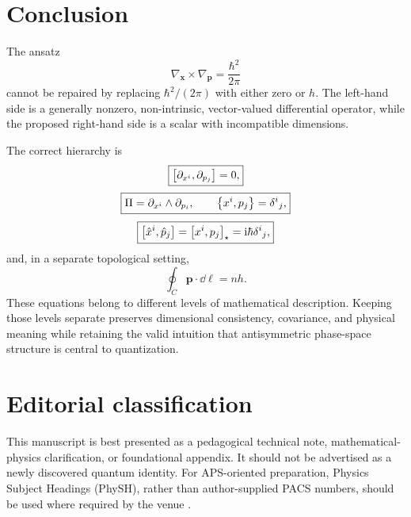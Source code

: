 \section{Conclusion}

The ansatz
\[
\nabla_{\bm{x}}\times\nabla_{\bm{p}}
=
\frac{\hbar^2}{2\pi}
\]
cannot be repaired by replacing \(\hbar^2/(2\pi)\) with either zero or \(h\). The left-hand side is a generally nonzero, non-intrinsic, vector-valued differential operator, while the proposed right-hand side is a scalar with incompatible dimensions.

The correct hierarchy is
\begin{equation}
\boxed{
\left[\partial_{x^i},\partial_{p_j}\right]=0,
}
\end{equation}
\begin{equation}
\boxed{
\Pi=\partial_{x^i}\wedge\partial_{p_i},
\qquad
\left\{x^i,p_j\right\}=\delta^i{}_j,
}
\end{equation}
\begin{equation}
\boxed{
\left[\hat x^i,\hat p_j\right]
=
\left[x^i,p_j\right]_{\star}
=
\mathrm{i}\hbar\delta^i{}_j,
}
\end{equation}
and, in a separate topological setting,
\begin{equation}
\boxed{
\oint_C\bm{p}\cdot\dd\bm{\ell}=nh.
}
\end{equation}
These equations belong to different levels of mathematical description. Keeping those levels separate preserves dimensional consistency, covariance, and physical meaning while retaining the valid intuition that antisymmetric phase-space structure is central to quantization.

\section*{Editorial classification}

This manuscript is best presented as a pedagogical technical note, mathematical-physics clarification, or foundational appendix. It should not be advertised as a newly discovered quantum identity. For APS-oriented preparation, Physics Subject Headings (PhySH), rather than author-supplied PACS numbers, should be used where required by the venue \cite{APSPhySH}.
